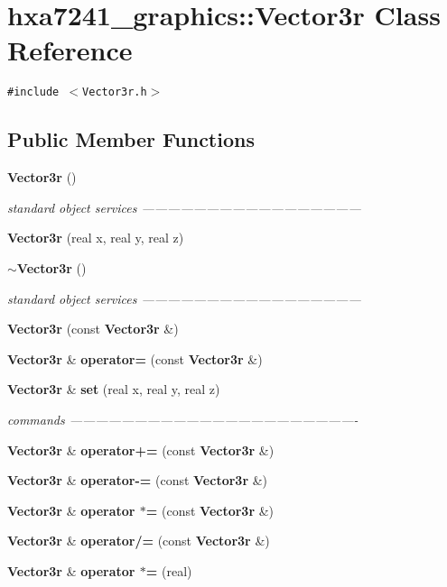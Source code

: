 \section{hxa7241\_\-graphics::Vector3r Class Reference}
\label{classhxa7241__graphics_1_1Vector3r}
{\tt \#include $<$Vector3r.h$>$}

\subsection*{Public Member Functions}
\begin{CompactItemize}
\item 
{\bf Vector3r} ()
\begin{CompactList}\small\item\em standard object services --------------------------------------------------- \item\end{CompactList}\item 
{\bf Vector3r} (real x, real y, real z)
\item 
{\bf $\sim$Vector3r} ()
\begin{CompactList}\small\item\em standard object services --------------------------------------------------- \item\end{CompactList}\item 
{\bf Vector3r} (const {\bf Vector3r} \&)
\item 
{\bf Vector3r} \& {\bf operator=} (const {\bf Vector3r} \&)
\item 
{\bf Vector3r} \& {\bf set} (real x, real y, real z)
\begin{CompactList}\small\item\em commands ------------------------------------------------------------------- \item\end{CompactList}\item 
{\bf Vector3r} \& {\bf operator+=} (const {\bf Vector3r} \&)
\item 
{\bf Vector3r} \& {\bf operator-=} (const {\bf Vector3r} \&)
\item 
{\bf Vector3r} \& {\bf operator $\ast$=} (const {\bf Vector3r} \&)
\item 
{\bf Vector3r} \& {\bf operator/=} (const {\bf Vector3r} \&)
\item 
{\bf Vector3r} \& {\bf operator $\ast$=} (real)
\item 

\end{CompactItemize}
